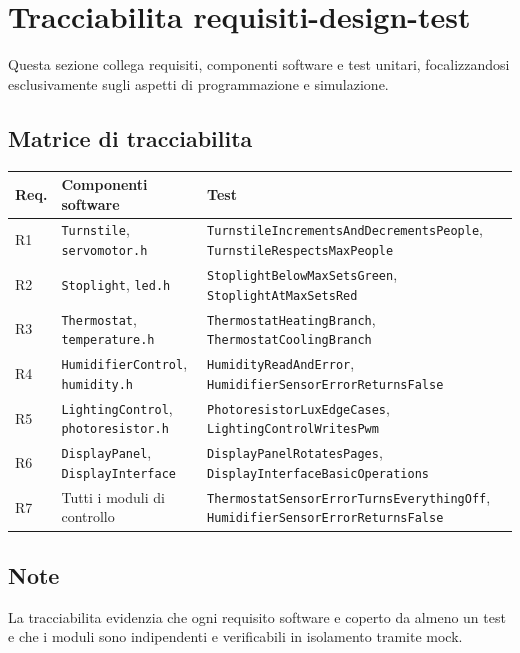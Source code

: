 \chapter{Tracciabilita requisiti-design-test}

Questa sezione collega requisiti, componenti software e test unitari, focalizzandosi esclusivamente sugli aspetti di programmazione e simulazione.

\section{Matrice di tracciabilita}
\begingroup
\sloppy
{}
\scriptsize
\setlength{\tabcolsep}{2pt}
\renewcommand{\arraystretch}{1.05}
\begin{tabularx}{\textwidth}{@{}>{\raggedright\arraybackslash}p{1.0cm}>{\raggedright\arraybackslash}X>{\raggedright\arraybackslash}X@{}}
\toprule
Req. & Componenti software & Test \\
\midrule
R1 & \texttt{Turnstile}, \texttt{servomotor.h} & \texttt{TurnstileIncrementsAndDecrementsPeople}, \texttt{TurnstileRespectsMaxPeople} \\
R2 & \texttt{Stoplight}, \texttt{led.h} & \texttt{StoplightBelowMaxSetsGreen}, \texttt{StoplightAtMaxSetsRed} \\
R3 & \texttt{Thermostat}, \texttt{temperature.h} & \texttt{ThermostatHeatingBranch}, \texttt{ThermostatCoolingBranch} \\
R4 & \texttt{HumidifierControl}, \texttt{humidity.h} & \texttt{HumidityReadAndError}, \texttt{HumidifierSensorErrorReturnsFalse} \\
R5 & \texttt{LightingControl}, \texttt{photoresistor.h} & \texttt{PhotoresistorLuxEdgeCases}, \texttt{LightingControlWritesPwm} \\
R6 & \texttt{DisplayPanel}, \texttt{DisplayInterface} & \texttt{DisplayPanelRotatesPages}, \texttt{DisplayInterfaceBasicOperations} \\
R7 & Tutti i moduli di controllo & \texttt{ThermostatSensorErrorTurnsEverythingOff}, \texttt{HumidifierSensorErrorReturnsFalse} \\
\bottomrule
\end{tabularx}
\renewcommand{\arraystretch}{1.0}
\setlength{\tabcolsep}{6pt}
\normalsize
\endgroup

\section{Note}
La tracciabilita evidenzia che ogni requisito software e coperto da almeno un test e che i moduli sono indipendenti e verificabili in isolamento tramite mock.

